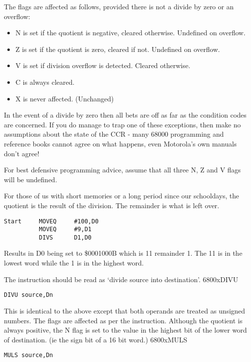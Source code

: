 The flags are affected as follows, provided there is not a divide by zero or an overflow:
\begin{itemize}[itemsep=0pt]

\item{}N is set if the quotient is negative, cleared otherwise.
          Undefined on overflow.


\item{}Z is set if the quotient is zero, cleared if not. Undefined on
          overflow.


\item{}V is set if division overflow is detected. Cleared
          otherwise.


\item{}C is always cleared.


\item{}X is never affected. (Unchanged)

\end{itemize}

\begin{warning}
In the event of a divide by zero then all bets are off as far as the condition codes are concerned. If you do manage to trap one of these exceptions, then make no assumptions about the state of the CCR - many 68000 programming and reference books cannot agree on what happens, even  Motorola's own manuals don't agree!

For best defensive programming advice, assume that all three N, Z and V flags will be undefined.
\end{warning}

For those of us with short memories or a long period since our
      schooldays, the quotient is the result of the division. The remainder is
      what is left over.

\begin{lstlisting}[firstnumber=1,caption={DIVS Example}]
Start     MOVEQ     #100,D0
          MOVEQ     #9,D1
          DIVS      D1,D0
\end{lstlisting}

Results in D0 being set to \$0001000B which is 11 remainder 1. The 11
      is in the lowest word while the 1 is in the highest word.

The instruction should be read as `divide source into
      destination'.
\mc6800x{DIVU}
\begin{lstlisting}[firstnumber=1]
          DIVU source,Dn
\end{lstlisting}

This is identical to the above except that both operands are
      treated as unsigned numbers. The flags are affected as per the 
      instruction. Although the quotient is always positive, the N flag is set
      to the value in the highest bit of the lower word of destination. (ie
      the sign bit of a 16 bit word.)
\mc6800x{MULS}
\begin{lstlisting}[firstnumber=1,]
          MULS source,Dn
\end{lstlisting}

